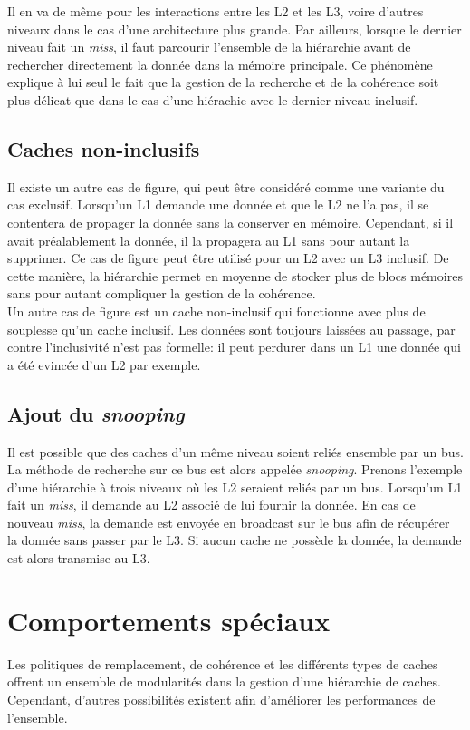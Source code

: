 Il en va de même pour les interactions entre les L2 et les L3, voire d'autres niveaux dans le cas d'une architecture plus grande. Par ailleurs, lorsque le dernier niveau fait un \textit{miss}, il faut parcourir l'ensemble de la hiérarchie avant de rechercher directement la donnée dans la mémoire principale. Ce phénomène explique à lui seul le fait que la gestion de la recherche et de la cohérence soit plus délicat que dans le cas d'une hiérachie avec le dernier niveau inclusif.

\subsection{Caches non-inclusifs}
Il existe un autre cas de figure, qui peut être considéré comme une variante du cas exclusif. Lorsqu'un L1 demande une donnée et que le L2 ne l'a pas, il se contentera de propager la donnée sans la conserver en mémoire. Cependant, si il avait préalablement la donnée, il la propagera au L1 sans pour autant la supprimer. Ce cas de figure peut être utilisé pour un L2 avec un L3 inclusif. De cette manière, la hiérarchie permet en moyenne de stocker plus de blocs mémoires sans pour autant compliquer la gestion de la cohérence. \\

Un autre cas de figure est un cache non-inclusif qui fonctionne avec plus de souplesse qu'un cache inclusif. Les données sont toujours laissées au passage, par contre l'inclusivité n'est pas formelle: il peut perdurer dans un L1 une donnée qui a été evincée d'un L2 par exemple.

\subsection{Ajout du \emph{snooping}}
\label{snooping}
 Il est possible que des caches d'un même niveau soient reliés ensemble par un bus. La méthode de recherche sur ce bus est alors appelée \emph{snooping}. Prenons l'exemple d'une hiérarchie à trois niveaux où les L2 seraient reliés par un bus. Lorsqu'un L1 fait un \textit{miss}, il demande au L2 associé de lui fournir la donnée. En cas de nouveau \textit{miss}, la demande est envoyée en broadcast sur le bus afin de récupérer la donnée sans passer par le L3. Si aucun cache ne possède la donnée, la demande est alors transmise au L3.

\section{Comportements spéciaux}
Les politiques de remplacement, de cohérence et les différents types de caches offrent un ensemble de modularités dans la gestion d'une hiérarchie de caches. Cependant, d'autres possibilités existent afin d'améliorer les performances de l'ensemble.

